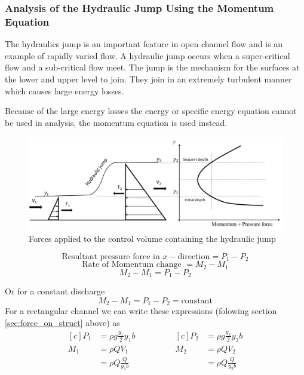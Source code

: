 \documentclass[a4paper, 12pt, british]{article} %
\numberwithin{equation}{section}
\numberwithin{figure}{section}
\numberwithin{table}{section}
\begin{document}
 
\subsubsection{Analysis of the Hydraulic Jump Using the Momentum Equation}
The hydraulics jump is an important feature in open channel flow and is an example of rapidly varied flow. A hydraulic jump occurs when a super-critical flow and a sub-critical flow meet. The jump is the mechanism for the surfaces at the lower and upper level to join. They join in an extremely turbulent manner which causes large energy losses.

Because of the large energy losses the energy or specific energy equation cannot be used in analysis, the momentum equation is used instead.

   \begin{figure}[H]
	\centering
	\includegraphics[scale=0.5]{./images/force_on_hydraulic_jump.png}
	\caption{Forces applied to the control volume containing the hydraulic jump}
	\label{fig:1112}
\end{figure}  

\begin{equation*}
\text{Resultant pressure force in } x-\text{direction} = P_1  - P_2
\end{equation*}
\begin{equation*}
\text{Rate of Momentum change } = M_2  - M_1
\end{equation*}
\begin{equation*}
 M_2  - M_1 = P_1  - P_2 
\end{equation*}

Or for a constant discharge
 \begin{equation*}
 M_2  - M_1 =  P_1  - P_2 = \text{constant}
 \end{equation*}
For a rectangular channel we can write these expressions (folowing section \ref{sec:force_on_struct} above) as
\begin{equation*}
\begin{aligned}[c]
P_1 & = \rho g \frac{y_1}{2}y_1b\\
M_1 &= \rho Q V_1\\
&= \rho Q \frac{Q}{y_1b}
\end{aligned}
\qquad\qquad
\begin{aligned}[c]
P_2 & = \rho g \frac{y_2}{2}y_2b\\
M_2 &= \rho Q V_2\\
&= \rho Q \frac{Q}{y_2b}
\end{aligned}
\end{equation*}
\end{document}
